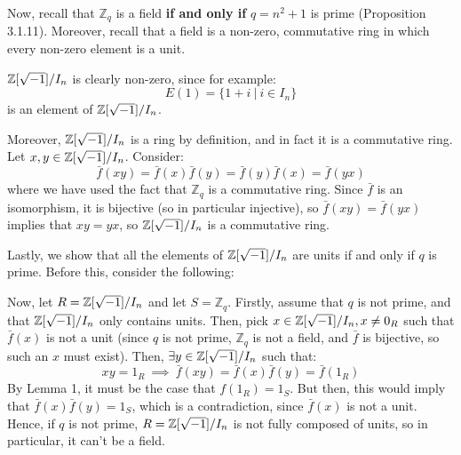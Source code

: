 \documentclass{exam}
\begin{document}
\begin{questions}
\smallskip

Now, recall that $\mathbb{Z}_q$ is a field \textbf{if and only if} $q = n^2 + 1$ is prime (Proposition 3.1.11). Moreover, recall that a field is a non-zero, commutative ring in which every non-zero element is a unit.

\smallskip

$\mathbb{Z}[\sqrt{-1}]/I_n$ is clearly non-zero, since for example:
\[
E(1) = \{1 + i \ | \ i \in I_n\}
\]
is an element of $\mathbb{Z}[\sqrt{-1}]/I_n$.

\smallskip

Moreover, $\mathbb{Z}[\sqrt{-1}]/I_n$ is a ring by definition, and in fact it is a commutative ring. Let $x,y \in \mathbb{Z}[\sqrt{-1}]/I_n$. Consider:
\[
\bar{f}(xy) = \bar{f}(x)\bar{f}(y) = \bar{f}(y)\bar{f}(x) = \bar{f}(yx)
\]
where we have used the fact that $\mathbb{Z}_q$ is a commutative ring. Since $\bar{f}$ is an isomorphism, it is bijective (so in particular injective), so $\bar{f}(xy) = \bar{f}(yx)$ implies that $xy = yx$, so $\mathbb{Z}[\sqrt{-1}]/I_n$ is a commutative ring.

\smallskip

Lastly, we show that all the elements of $\mathbb{Z}[\sqrt{-1}]/I_n$ are units if and only if $q$ is prime. Before this, consider the following:


Now, let $R = \mathbb{Z}[\sqrt{-1}]/I_n$ and let $S = \mathbb{Z}_q$. Firstly, assume that $q$ is not prime, and that $\mathbb{Z}[\sqrt{-1}]/I_n$ only contains units. Then, pick $x \in \mathbb{Z}[\sqrt{-1}]/I_n, x \neq 0_R$ such that $\bar{f}(x)$ is not a unit (since $q$ is not prime, $\mathbb{Z}_q$ is not a field, and $\bar{f}$ is bijective, so such an $x$ must exist). Then, $\exists y \in \mathbb{Z}[\sqrt{-1}]/I_n$ such that:
\[
xy = 1_R \ \implies \ \bar{f}(xy) = \bar{f}(x)\bar{f}(y) = \bar{f}(1_R)
\]
By Lemma 1, it must be the case that $f(1_R) = 1_S$. But then, this would imply that $\bar{f}(x)\bar{f}(y) = 1_S$, which is a contradiction, since $\bar{f}(x)$ is not a unit. Hence, if $q$ is not prime, $R = \mathbb{Z}[\sqrt{-1}]/I_n$ is not fully composed of units, so in particular, it can't be a field.


\end{questions}
\end{document}
